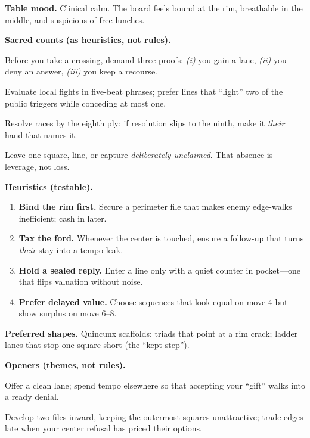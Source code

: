 \documentclass[11pt]{article}
\numberwithin{equation}{section} %
\theoremstyle{plain} %
\theoremstyle{definition} %
\theoremstyle{remark} %
\begin{document}
\medskip
\noindent\textbf{Table mood.} Clinical calm. The board feels bound at the rim, breathable in the middle, and suspicious of free lunches.

\medskip
\noindent\textbf{Sacred counts (as heuristics, not rules).}
\begin{description}\setlength\itemsep{0.35em}
  \item[\textbf{3} — Proof.] Before you take a crossing, demand three proofs: \emph{(i)} you gain a lane, \emph{(ii)} you deny an answer, \emph{(iii)} you keep a recourse.
  \item[\textbf{5} — Candles.] Evaluate local fights in five-beat phrases; prefer lines that “light” two of the public triggers while conceding at most one.
  \item[\textbf{8} — Work.] Resolve races by the eighth ply; if resolution slips to the ninth, make it \emph{their} hand that names it.
  \item[\textbf{9} — Remaining.] Leave one square, line, or capture \emph{deliberately unclaimed}. That absence is leverage, not loss.
\end{description}

\medskip
\noindent\textbf{Heuristics (testable).}
\begin{enumerate}\setlength\itemsep{0.25em}
  \item \textbf{Bind the rim first.} Secure a perimeter file that makes enemy edge-walks inefficient; cash in later.
  \item \textbf{Tax the ford.} Whenever the center is touched, ensure a follow-up that turns \emph{their} stay into a tempo leak.
  \item \textbf{Hold a sealed reply.} Enter a line only with a quiet counter in pocket—one that flips valuation without noise.
  \item \textbf{Prefer delayed value.} Choose sequences that look equal on move 4 but show surplus on move 6–8.
\end{enumerate}

\medskip
\noindent\textbf{Preferred shapes.} Quincunx scaffolds; triads that point at a rim crack; ladder lanes that stop one square short (the “kept step”).

\medskip
\noindent\textbf{Openers (themes, not rules).}
\begin{description}\setlength\itemsep{0.35em}
  \item[\textit{Copper Ledger.}] Offer a clean lane; spend tempo elsewhere so that accepting your “gift” walks into a ready denial.
  \item[\textit{Salt Ring.}] Develop two files inward, keeping the outermost squares unattractive; trade edges late when your center refusal has priced their options.
\end{description}
\end{document}
